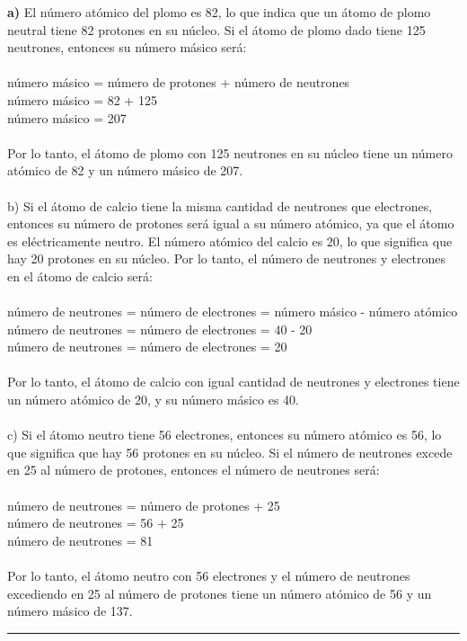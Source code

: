 \documentclass{article}
\begin{document}
\textbf{a)} El número atómico del plomo es 82, lo que indica que un átomo de plomo neutral tiene 82 protones en su núcleo. Si el átomo de plomo dado tiene 125 neutrones, entonces su número másico será:\\
\\
número másico = número de protones + número de neutrones\\
número másico = 82 + 125\\
número másico = 207\\
\\
Por lo tanto, el átomo de plomo con 125 neutrones en su núcleo tiene un número atómico de 82 y un número másico de 207.\\
\\
b) Si el átomo de calcio tiene la misma cantidad de neutrones que electrones, entonces su número de protones será igual a su número atómico, ya que el átomo es eléctricamente neutro. El número atómico del calcio es 20, lo que significa que hay 20 protones en su núcleo. Por lo tanto, el número de neutrones y electrones en el átomo de calcio será:\\
\\
número de neutrones = número de electrones = número másico - número atómico\\
número de neutrones = número de electrones = 40 - 20\\
número de neutrones = número de electrones = 20\\
\\
Por lo tanto, el átomo de calcio con igual cantidad de neutrones y electrones tiene un número atómico de 20, y su número másico es 40.\\
\\
c) Si el átomo neutro tiene 56 electrones, entonces su número atómico es 56, lo que significa que hay 56 protones en su núcleo. Si el número de neutrones excede en 25 al número de protones, entonces el número de neutrones será:\\
\\
número de neutrones = número de protones + 25\\
número de neutrones = 56 + 25\\
número de neutrones = 81\\
\\
Por lo tanto, el átomo neutro con 56 electrones y el número de neutrones excediendo en 25 al número de protones tiene un número atómico de 56 y un número másico de 137.\\
\noindent\rule{\textwidth}{1pt} \\
\end{document}
